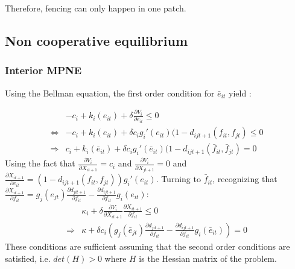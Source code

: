 Therefore, fencing can only happen in one patch. 
\subsection{Non cooperative equilibrium}
\subsubsection{Interior MPNE}
\label{appendix:interior_mpne}
Using the Bellman equation, the first order condition for $\bar{e}_{it}$ yield : 

\begin{align*}
&- c_i + k_i(e_{it}) + \delta \frac{\partial V_i}{\partial e_{it}}\leq 0 \\
\iff &  - c_i + k_i(e_{it}) + \delta c_i g_i'(e_{it}) (1 - d_{ijt+1}(f_{it},f_{jt})\leq 0\\
\Rightarrow &  c_i + k_i(\bar{e}_{it}) + \delta c_i g_i'(\bar{e}_{it}) (1 - d_{ijt+1}(\bar{f}_{it},\bar{f}_{jt}) = 0
\end{align*}
Using the fact that $\frac{\partial V_i}{\partial X_{it+1}} = c_i$ and $\frac{\partial V_i}{\partial X_{jt+1}}=0$ and $\frac{\partial X_{it+1}}{\partial e_{it}} = (1 - d_{ijt+1}(f_{it},f_{jt}))g_i'(e_{it})$. Turning to $\bar{f}_{it}$, recognizing that $\frac{\partial X_{it+1}}{\partial f_{it}} = g_j(e_{jt})\frac{\partial d_{jit+1}}{\partial f_{it}} - \frac{\partial d_{ijt+1}}{\partial f_{it}}g_i(e_{it})$:
\begin{align*}
& \kappa_i + \delta \frac{\partial V_i}{\partial X_{it+1}}\frac{\partial X_{it+1}}{\partial f_{it}}\leq 0\\
\Rightarrow & \kappa + \delta c_i \left( g_j(\bar{e}_{jt})\frac{\partial d_{jit+1}}{\partial f_{it}} - \frac{\partial d_{ijt+1}}{\partial f_{it}}g_i(\bar{e}_{it})\right) = 0
\end{align*}
These conditions are sufficient assuming that the second order conditions are satisfied, i.e. $det(H)>0$ where $H$ is the Hessian matrix of the problem.

\clearpage



{\footnotesize


}
\cleardoublepage